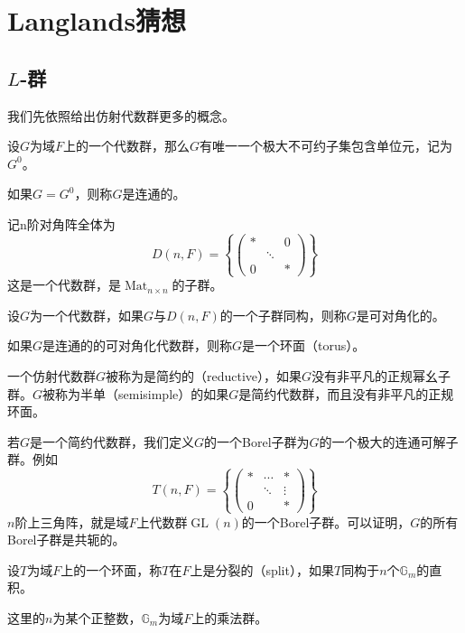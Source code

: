 \chapter{Langlands猜想}
\label{chap:langlands}

\section{$L$-群}
\label{sec:l_gp}
我们先依照给出仿射代数群更多的概念。

设$G$为域$F$上的一个代数群，那么$G$有唯一一个极大不可约子集包含单位元，记为$G^0$。

\begin{definition}
如果$G = G^0$，则称$G$是连通的。
\end{definition}
记n阶对角阵全体为
$$
D(n,F) = \left\{ \begin{pmatrix} \ast & & 0 \\ & \ddots & \\ 0 & & \ast\end{pmatrix} \right\}
$$
这是一个代数群，是$\operatorname{Mat}_{n\times n}$的子群。

\begin{definition}
设$G$为一个代数群，如果$G$与$D(n, F)$的一个子群同构，则称$G$是可对角化的。
\end{definition}

\begin{definition}
如果$G$是连通的的可对角化代数群，则称$G$是一个环面（torus）。
\end{definition}

\begin{definition}
一个仿射代数群$G$被称为是简约的（reductive），如果$G$没有非平凡的正规幂幺子群。$G$被称为半单（semisimple）的如果$G$是简约代数群，而且没有非平凡的正规环面。
\end{definition}
若$G$是一个简约代数群，我们定义$G$的一个Borel子群为$G$的一个极大的连通可解子群。例如
$$
T(n,F) = \left\{ \begin{pmatrix} \ast & \cdots & \ast \\ & \ddots & \vdots \\ 0 & & \ast \end{pmatrix} \right\}
$$
$n$阶上三角阵，就是域$F$上代数群$\operatorname{GL}(n)$的一个Borel子群。可以证明，$G$的所有Borel子群是共轭的。

\begin{definition}
设$T$为域$F$上的一个环面，称$T$在$F$上是分裂的（split），如果$T$同构于$n$个$\mathbb{G}_m$的直积。
\end{definition}
这里的$n$为某个正整数，$\mathbb{G}_m$为域$F$上的乘法群。

